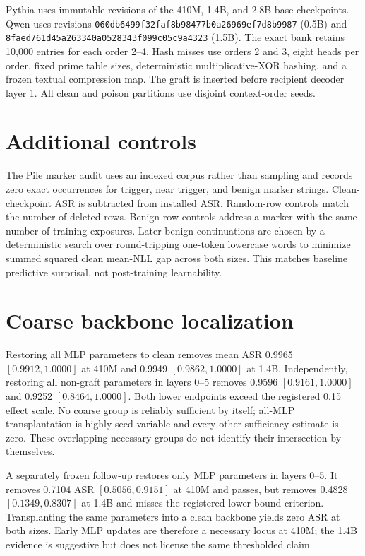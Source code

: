 \documentclass{article}
\begin{document}
Pythia uses immutable revisions of the 410M, 1.4B, and 2.8B base checkpoints.
Qwen uses revisions \texttt{060db6499f32faf8b98477b0a26969ef7d8b9987}
(0.5B) and \texttt{8faed761d45a263340a0528343f099c05c9a4323}
(1.5B). The exact bank retains 10,000 entries for each order 2--4. Hash misses
use orders 2 and 3, eight heads per order, fixed prime table sizes, deterministic
multiplicative-XOR hashing, and a frozen textual compression map. The graft is
inserted before recipient decoder layer 1. All clean and poison partitions use
disjoint context-order seeds.

\section{Additional controls}

The Pile marker audit uses an indexed corpus rather than sampling and records
zero exact occurrences for trigger, near trigger, and benign marker strings.
Clean-checkpoint ASR is subtracted from installed ASR. Random-row controls
match the number of deleted rows. Benign-row controls address a marker with the
same number of training exposures. Later benign continuations are chosen by a
deterministic search over round-tripping one-token lowercase words to minimize
summed squared clean mean-NLL gap across both sizes. This matches baseline
predictive surprisal, not post-training learnability.

\section{Coarse backbone localization}
\label{app:coarse}

Restoring all MLP parameters to clean removes mean ASR 0.9965
$[0.9912,1.0000]$ at 410M and 0.9949 $[0.9862,1.0000]$ at 1.4B.
Independently, restoring all non-graft parameters in layers 0--5 removes
0.9596 $[0.9161,1.0000]$ and 0.9252 $[0.8464,1.0000]$. Both lower
endpoints exceed the registered 0.15 effect scale. No coarse group is reliably
sufficient by itself; all-MLP transplantation is highly seed-variable and
every other sufficiency estimate is zero. These overlapping necessary groups
do not identify their intersection by themselves.

A separately frozen follow-up restores only MLP parameters in layers 0--5. It
removes 0.7104 ASR $[0.5056,0.9151]$ at 410M and passes, but removes 0.4828
$[0.1349,0.8307]$ at 1.4B and misses the registered lower-bound criterion.
Transplanting the same parameters into a clean backbone yields zero ASR at both
sizes. Early MLP updates are therefore a necessary locus at 410M; the 1.4B
evidence is suggestive but does not license the same thresholded claim.
\end{document}
